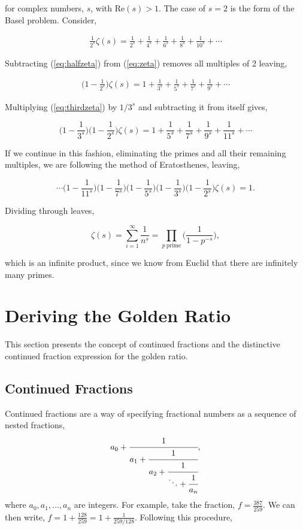 \documentclass[11pt]{amsart}
\begin{document}
for complex numbers, $s$, with $\text{Re}(s) > 1$. The case of $s = 2$ is the form of the Basel problem. Consider,

\begin{align}\frac{1}{2^s}\zeta(s) = \frac{1}{2^s} + \frac{1}{4^s} + \frac{1}{6^s} + \frac{1}{8^s} + \frac{1}{10^s} + \cdots \label{eq:halfzeta}
\end{align}

Subtracting (\ref{eq:halfzeta}) from (\ref{eq:zeta}) removes all multiples of 2 leaving,

\begin{align}\Big(1 - \frac{1}{2^s}\Big)\zeta(s) = 1 + \frac{1}{3^s} + \frac{1}{5^s} + \frac{1}{7^s} + \frac{1}{9^s} + \cdots \label{eq:thirdzeta}
\end{align}

Multiplying (\ref{eq:thirdzeta}) by $1/3^s$ and subtracting it from itself gives,

$$\Big(1 - \frac{1}{3^s}\Big)\Big(1 - \frac{1}{2^s}\Big)\zeta(s) = 1 + \frac{1}{5^s} + \frac{1}{7^s} + \frac{1}{9^s} + \frac{1}{11^s} + \cdots$$

If we continue in this fashion, eliminating the primes and all their remaining multiples, we are following the method of Eratosthenes, leaving,

$$
\cdots\Big(1 - \frac{1}{11^s}\Big)\Big(1 - \frac{1}{7^s}\Big)\Big(1 - \frac{1}{5^s}\Big)\Big(1 - \frac{1}{3^s}\Big)\Big(1 - \frac{1}{2^s}\Big)\zeta(s) = 1.
$$

Dividing through leaves,

$$\zeta(s) = \sum_{i=1}^{\infty}\frac{1}{n^s} = \prod_{p \ \text{prime}}\Bigg(\frac{1}{1 - p^{-s}}\Bigg),$$

which is an infinite product, since we know from Euclid that there are infinitely many primes.

\section{Deriving the Golden Ratio}

This section presents the concept of continued fractions and the distinctive continued fraction expression for the golden ratio.

\subsection{Continued Fractions}
Continued fractions are a way of specifying fractional numbers as a sequence of nested fractions,
$$a_0 + \cfrac{1}{a_1 + \cfrac{1}{a_2 + \cfrac{1}{\ddots + \cfrac{1}{a_n}}}},$$
where $a_0, a_1, \dots, a_n$ are integers. For example, take the fraction, $ f = \frac{387}{259}$. We can then write, $f = 1 + \frac{128}{259} = 1 + \frac{1}{259/128}$. Following this procedure,
\end{document}
